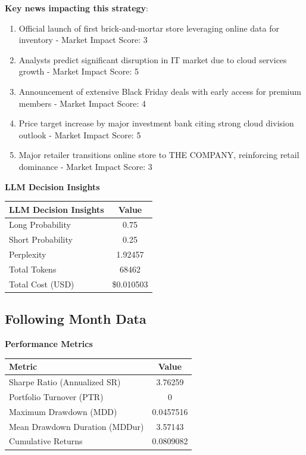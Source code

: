 \documentclass[8pt]{scrartcl}
\begin{document}
\textbf{Key news impacting this strategy}:
\begin{enumerate}
    \item Official launch of first brick-and-mortar store leveraging online data for inventory - Market Impact Score: 3
    \item Analysts predict significant disruption in IT market due to cloud services growth - Market Impact Score: 5
    \item Announcement of extensive Black Friday deals with early access for premium members - Market Impact Score: 4
    \item Price target increase by major investment bank citing strong cloud division outlook - Market Impact Score: 5
    \item Major retailer transitions online store to THE COMPANY, reinforcing retail dominance - Market Impact Score: 3
\end{enumerate}

\textbf{LLM Decision Insights}

\begin{longtable}{l c}
\toprule
\textbf{LLM Decision Insights} & \textbf{Value} \\
\midrule
Long Probability & 0.75 \\
Short Probability & 0.25 \\
Perplexity & 1.92457 \\
\midrule
Total Tokens & 68462 \\
Total Cost (USD) & \$0.010503 \\
\bottomrule
\end{longtable}

\subsection*{Following Month Data}

\textbf{Performance Metrics}

\begin{longtable}{l c}
\toprule
\textbf{Metric} & \textbf{Value} \\
\midrule
Sharpe Ratio (Annualized SR) & 3.76259 \\
Portfolio Turnover (PTR) & 0 \\
Maximum Drawdown (MDD) & 0.0457516 \\
Mean Drawdown Duration (MDDur) & 3.57143 \\
Cumulative Returns & 0.0809082 \\
\bottomrule
\end{longtable}
\end{document}
